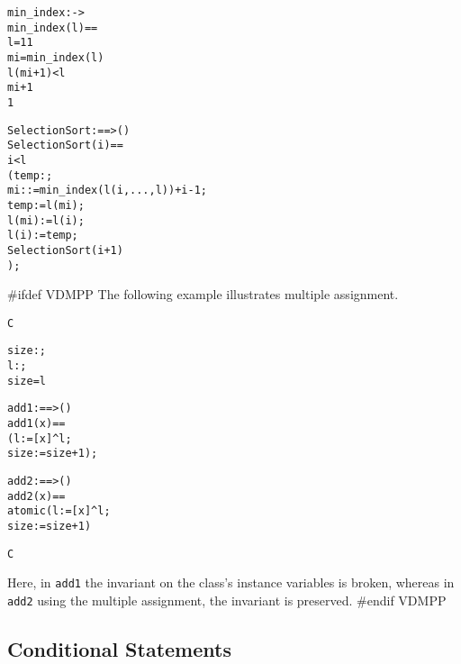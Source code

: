 \documentclass[\pformat,12pt]{article}
\begin{document}
\begin{description}
\begin{alltt}
  min_index :  -> 
  min_index(l) ==
   l = 1  1
   mi = min_index( l)
      l(mi+1) <  l
        mi+1
        1


  SelectionSort :  ==> ()
  SelectionSort (i) ==
     i <  l
     ( temp: ;
          mi :  := min_index(l(i,..., l)) + i - 1;
         temp := l(mi);
         l(mi) := l(i);
         l(i) := temp;
         SelectionSort(i+1)
        );
  \end{alltt}
#ifdef VDMPP
  The following example illustrates multiple assignment.
  \begin{alltt}
   C

      size : ;
      l : ;
     size =  l

      add1 :  ==> ()
      add1 (x) ==
         ( l := [x] ^ l;
           size := size + 1);

      add2 :  ==> ()
      add2 (x) ==
         atomic (l := [x] ^ l;
                 size := size + 1)

   C
  \end{alltt}
Here, in \texttt{add1} the invariant on the class's instance variables
is broken, whereas in \texttt{add2} using the multiple assignment, the
invariant is preserved.
#endif VDMPP

\end{description}

\subsection{Conditional Statements}\label{condstmt}
\end{document}
